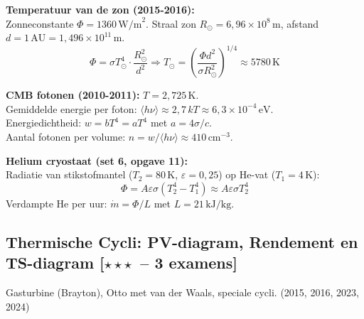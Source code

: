 \documentclass[10pt,a4paper]{article}
\begin{document}
\begin{oplossing}
\textbf{Temperatuur van de zon (2015-2016):}\\
Zonneconstante $\Phi = 1360\,\text{W/m}^2$. Straal zon $R_\odot = 6{,}96\times10^8\,\text{m}$, afstand $d = 1\,\text{AU} = 1{,}496\times10^{11}\,\text{m}$.
$$\Phi = \sigma T_\odot^4 \cdot \frac{R_\odot^2}{d^2} \Rightarrow T_\odot = \left(\frac{\Phi d^2}{\sigma R_\odot^2}\right)^{1/4} \approx 5780\,\text{K}$$

\textbf{CMB fotonen (2010-2011):} $T = 2{,}725\,\text{K}$.\\
Gemiddelde energie per foton: $\langle h\nu\rangle \approx 2{,}7\,kT \approx 6{,}3\times10^{-4}\,\text{eV}$.\\
Energiedichtheid: $w = bT^4 = aT^4$ met $a = 4\sigma/c$.\\
Aantal fotonen per volume: $n = w/\langle h\nu\rangle \approx 410\,\text{cm}^{-3}$.

\textbf{Helium cryostaat (set 6, opgave 11):}\\
Radiatie van stikstofmantel ($T_2 = 80\,\text{K}$, $\varepsilon = 0{,}25$) op He-vat ($T_1 = 4\,\text{K}$):
$$\Phi = A\varepsilon\sigma(T_2^4 - T_1^4) \approx A\varepsilon\sigma T_2^4$$
Verdampte He per uur: $\dot{m} = \Phi/L$ met $L = 21\,\text{kJ/kg}$.
\end{oplossing}

\subsection{Thermische Cycli: PV-diagram, Rendement en TS-diagram \textnormal{\color{warningred}[$\star\star\star$\ -- 3 examens]}}

\begin{oefening}{Gasturbine (Brayton), Otto met van der Waals, speciale cycli. \textnormal{(2015, 2016, 2023, 2024)}}
\end{oefening}
\end{document}

